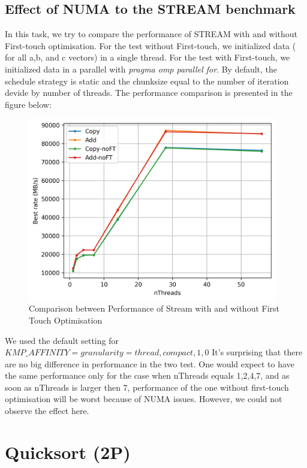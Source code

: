 \documentclass[article]{scrartcl}
\begin{document}
\subsection{Effect of NUMA to the STREAM benchmark}
In this task, we try to compare the performance of STREAM with and without First-touch optimisation. For the test without First-touch, we initialized data ( for all a,b, and c vectors) in a single thread. For the test with First-touch, we initialized data in a parallel with \textit{pragma omp parallel for}. By default, the schedule strategy is static and the chunksize equal to the number of iteration devide by number of threads. The performance comparison is presented in the figure below:
\begin{figure}[htpb]
    \centering
    \includegraphics[width=\textwidth,height=8cm,keepaspectratio=true]{../figs/2.6_StreamCompare.png}
    \caption{Comparison between Performance of Stream with and without First Touch Optimisation}
    \label{fig:stream1}
\end{figure}
We used the default setting for $KMP\_AFFINITY=granularity=thread,compact,1,0$
It's surprising that there are no big difference in performance in the two test. One would expect to have the same performance only for the case when nThreads equals 1,2,4,7, and as soon as nThreads is larger then 7, performance of the one without first-touch optimisation will be worst because of NUMA issues. However, we could not observe the effect here.



\section{Quicksort (2P)}
\end{document}
